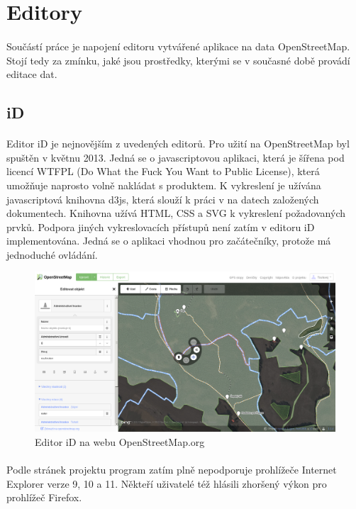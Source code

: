 \documentclass[11pt,a4paper,titlepage,oneside]{book}
\begin{document}
	\section{Editory} %
		\paragraph{} Součástí práce je napojení editoru vytvářené aplikace na data OpenStreetMap. Stojí tedy za zmínku, jaké jsou prostředky, kterými se v současné době provádí editace dat. 
		\subsection{iD}
			\paragraph{}Editor iD je nejnovějším z uvedených editorů. Pro užití na OpenStreetMap byl spuštěn v květnu 2013. Jedná se o javascriptovou aplikaci, která je šířena pod licencí WTFPL (Do What the Fuck You Want to Public License)\cite{wiki_wtfpl}, která umožňuje naprosto volně nakládat s produktem. K vykreslení je užívána javascriptová knihovna d3js, která slouží k práci v na datech založených dokumentech. Knihovna užívá HTML, CSS a SVG k vykreslení požadovaných prvků. Podpora jiných vykreslovacích přístupů není zatím v editoru iD implementována. Jedná se o aplikaci vhodnou pro začátečníky, protože má jednoduché ovládání.

		\begin{figure}[!h]
			\begin{center}
				\includegraphics[width=12cm]{obrazky/iD_osm.png}
				\caption{Editor iD na webu OpenStreetMap.org}
				\label{fig:iD_osm}
			\end{center}
		\end{figure}

			\paragraph{} Podle stránek projektu\cite{wiki_iD} program zatím plně nepodporuje prohlížeče Internet Explorer verze 9, 10 a 11. Někteří uživatelé též hlásili zhoršený výkon pro prohlížeč Firefox.
\end{document}
